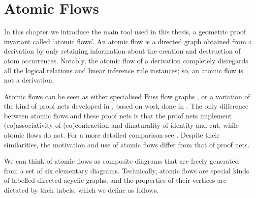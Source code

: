 
\chapter{Atomic Flows}



In this chapter we introduce the main tool used in this thesis, a geometric proof invariant called `atomic flows'. An atomic flow is a directed graph obtained from a derivation by only retaining information about the creation and destruction of atom occurrences. Notably, the atomic flow of a derivation completely disregards all the logical relations and linear inference rule instances; so, an atomic flow is not a derivation.


Atomic flows can be seen as either specialised Buss flow graphs \cite{Buss:91:The-Unde:uq,Carb:97:Interpol:fk}, or a variation of the kind of proof nets developed in \cite{Stra:05:From-Dee:yb,Stra:09:From-Dee:fr}, based on work done in \cite{LamaStra:05:Naming-P:ov}. The only difference between atomic flows and these proof nets is that the proof nets implement (co)associativity of (co)contraction and dinaturality of identity and cut, while atomic flows do not. For a more detailed comparison see \cite{Stra:09:From-Dee:fr}. Despite their similarities, the motivation and use of atomic flows differ from that of proof nets.


We can think of atomic flows as composite diagrams that are freely generated from a set of six elementary diagrams. Technically, atomic flows are special kinds of labelled directed acyclic graphs, and the properties of their vertices are dictated by their labels, which we define as follows.

